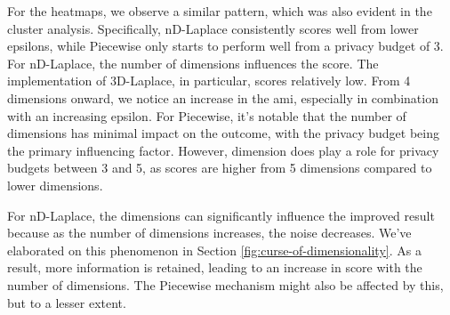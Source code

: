 {\begin{figure}[H]
\end{figure}
For the heatmaps, we observe a similar pattern, which was also evident in the cluster analysis. Specifically, nD-Laplace consistently scores well from lower epsilons, while Piecewise only starts to perform well from a privacy budget of 3.
For nD-Laplace, the number of dimensions influences the score. The implementation of 3D-Laplace, in particular, scores relatively low. From 4 dimensions onward, we notice an increase in the \gls{ami}, especially in combination with an increasing \gls{epsilon}.
For Piecewise, it's notable that the number of dimensions has minimal impact on the outcome, with the privacy budget being the primary influencing factor. However, dimension does play a role for privacy budgets between 3 and 5, as scores are higher from 5 dimensions compared to lower dimensions.

For nD-Laplace, the dimensions can significantly influence the improved result because as the number of dimensions increases, the noise decreases. We've elaborated on this phenomenon in Section \ref{fig:curse-of-dimensionality}. As a result, more information is retained, leading to an increase in score with the number of dimensions. The Piecewise mechanism might also be affected by this, but to a lesser extent.

\newpage
}
